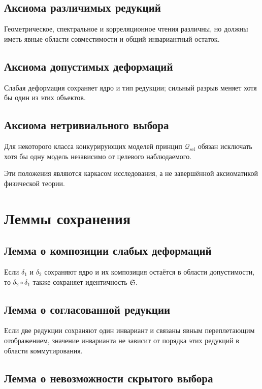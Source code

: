 \section{Аксиома различимых редукций}

Геометрическое, спектральное и корреляционное чтения различны, но должны иметь
явные области совместимости и общий инвариантный остаток.

\section{Аксиома допустимых деформаций}

Слабая деформация сохраняет ядро и тип редукции; сильный разрыв меняет хотя бы
один из этих объектов.

\section{Аксиома нетривиального выбора}

Для некоторого класса конкурирующих моделей принцип $\mathcal Q_{\mathrm{sel}}$
обязан исключать хотя бы одну модель независимо от целевого наблюдаемого.

Эти положения являются каркасом исследования, а не завершённой аксиоматикой
физической теории.

\chapter{Леммы сохранения}

\section{Лемма о композиции слабых деформаций}

Если $\delta_1$ и $\delta_2$ сохраняют ядро и их композиция остаётся в области
допустимости, то $\delta_2\circ\delta_1$ также сохраняет идентичность
$\mathfrak S$.

\section{Лемма о согласованной редукции}

Если две редукции сохраняют один инвариант и связаны явным переплетающим
отображением, значение инварианта не зависит от порядка этих редукций в
области коммутирования.

\section{Лемма о невозможности скрытого выбора}

